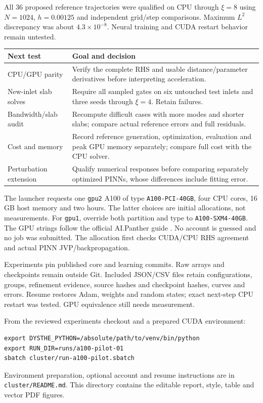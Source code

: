 \documentclass[11pt]{article}
\begin{document}
All 36 proposed reference trajectories were qualified on CPU through $\xi=8$ using $N=1024$, $h=0.00125$ and independent grid/step comparisons. Maximum $L^2$ discrepancy was about $4.3\times10^{-8}$. Neural training and CUDA restart behavior remain untested.

\begin{center}\small
\begin{tabular}{p{}p{}}\toprule
Next test & Goal and decision\\\midrule
CPU/GPU parity & Verify the complete RHS and usable distance/parameter derivatives before interpreting acceleration.\\
New-inlet slab solves & Require all sampled gates on six untouched test inlets and three seeds through $\xi=4$. Retain failures.\\
Bandwidth/slab audit & Recompute difficult cases with more modes and shorter slabs; compare actual reference errors and full residuals.\\
Cost and memory & Record reference generation, optimization, evaluation and peak GPU memory separately; compare full cost with the CPU solver.\\
Perturbation extension & Qualify numerical responses before comparing separately optimized PINNs, whose differences include fitting error.\\\bottomrule
\end{tabular}
\end{center}

The launcher requests one \texttt{gpu2} A100 of type \texttt{A100-PCI-40GB}, four CPU cores, 16 GB host memory and two hours. The latter choices are initial allocations, not measurements. For \texttt{gpu1}, override both partition and type to \texttt{A100-SXM4-40GB}. The GPU strings follow the official AI.Panther guide \cite{cluster}. No account is guessed and no job was submitted. The allocation first checks CUDA/CPU RHS agreement and actual PINN JVP/backpropagation.

Experiments pin published core and learning commits. Raw arrays and checkpoints remain outside Git. Included JSON/CSV files retain configurations, groups, refinement evidence, source hashes and checkpoint hashes, curves and errors. Resume restores Adam, weights and random states; exact next-step CPU restart was tested. GPU equivalence still needs measurement.

From the reviewed experiments checkout and a prepared CUDA environment:
\begin{verbatim}
export DYSTHE_PYTHON=/absolute/path/to/venv/bin/python
export RUN_DIR=runs/a100-pilot-01
sbatch cluster/run-a100-pilot.sbatch
\end{verbatim}
Environment preparation, optional account and resume instructions are in \texttt{cluster/README.md}. This directory contains the editable report, style, table and vector PDF figures.
\end{document}
